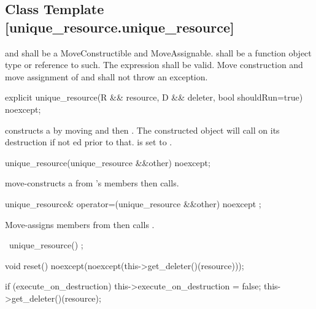 \documentclass[ebook,11pt,article]{memoir}
\begin{document}
\subsection {Class Template  [unique_resource.unique_resource]}

\pnum
\requires  {} and  shall be a MoveConstructible and MoveAssignable.
 shall be a function object type or reference to such. 
The expression  shall be valid.
Move construction and move assignment of  and  shall not throw an exception.


\begin{itemdecl}
explicit
unique_resource(R && resource, D && deleter, bool shouldRun=true) noexcept;
\end{itemdecl}

\pnum
\effects constructs a  by moving  and then . The constructed object will call  on its destruction if not ed prior to that.  is set to .

\begin{itemdecl}
unique_resource(unique_resource &&other) noexcept;
\end{itemdecl}

\pnum
\effects move-constructs a  from 's members then calls.

\begin{itemdecl}
unique_resource& operator=(unique_resource  &&other) noexcept ;
\end{itemdecl}

\pnum
\effects {} Move-assigns members from  then calls .

\begin{itemdecl}
~unique_resource() ;
\end{itemdecl}

\pnum
\effects {}

\begin{itemdecl}
void reset() noexcept(noexcept(this->get_deleter()(resource)));
\end{itemdecl}

\pnum
\effects 
\begin{codeblock}
if (execute_on_destruction)  {
    this->execute_on_destruction = false;
	this->get_deleter()(resource);
}
\end{codeblock}
\end{document}
